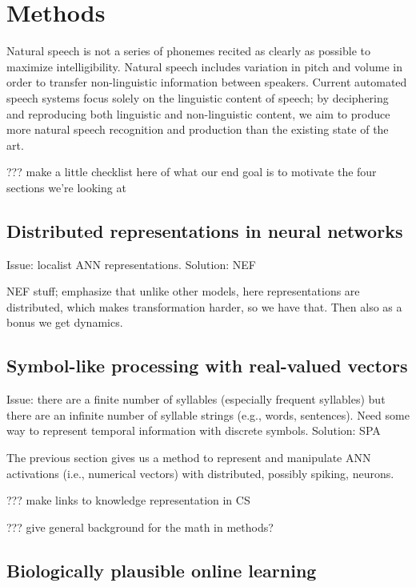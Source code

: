 \chapter{Methods}

Natural speech is not a series of phonemes
recited as clearly as possible
to maximize intelligibility.
Natural speech includes variation in
pitch and volume in order to transfer
non-linguistic information between speakers.
Current automated speech systems
focus solely on the linguistic content
of speech;
by deciphering and reproducing both
linguistic and non-linguistic content,
we aim to produce more natural speech
recognition and production
than the existing state of the art.

??? make a little checklist here of what our end goal
is to motivate the four sections we're looking at

\section{Distributed representations in neural networks}

Issue: localist ANN representations. Solution: NEF

NEF stuff; emphasize that unlike other models,
here representations are distributed,
which makes transformation harder,
so we have that.
Then also as a bonus we get dynamics.

\section{Symbol-like processing with real-valued vectors}

Issue: there are a finite number of syllables
(especially frequent syllables) but there are an infinite
number of syllable strings (e.g., words, sentences).
Need some way to represent temporal information
with discrete symbols.
Solution: SPA

The previous section gives us a method to represent
and manipulate ANN activations (i.e., numerical vectors)
with distributed, possibly spiking, neurons.

??? make links to knowledge representation in CS

??? give general background for the math in methods?

\section{Biologically plausible online learning}

